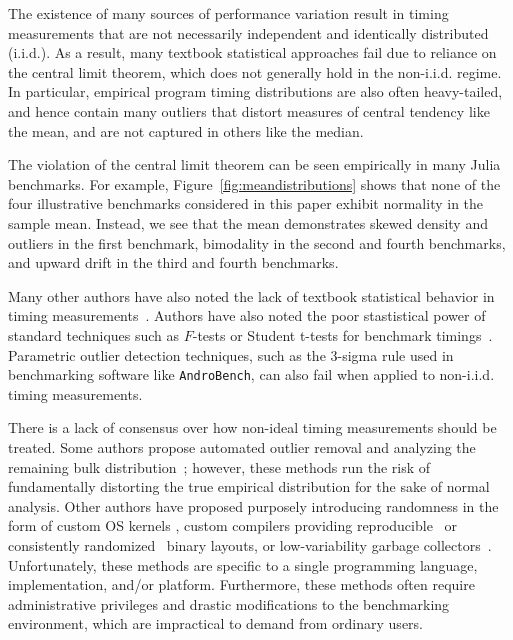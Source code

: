 \documentclass[conference]{IEEEtran}
\begin{document}
The existence of many sources of performance variation result in timing
measurements that are not necessarily independent and identically distributed
(i.i.d.). As a result, many textbook statistical approaches fail due to
reliance on the central limit theorem, which does not generally hold in the
non-i.i.d. regime. In particular, empirical program timing distributions are
also often heavy-tailed, and hence contain many outliers that distort measures
of central tendency like the mean, and are not captured in others like the
median.

The violation of the central limit theorem can be seen empirically in many Julia benchmarks.
For example, Figure~\ref{fig:meandistributions} shows that none of the four illustrative
benchmarks considered in this paper exhibit normality in the sample mean. Instead, we see
that the mean demonstrates skewed density and outliers in the first benchmark, bimodality in
the second and fourth benchmarks, and upward drift in the third and fourth benchmarks.

Many other authors have also noted the lack of textbook statistical behavior in timing
measurements~\cite{Gil2011,Chen2015,Rehn2015,Barrett2016}. Authors have also noted the poor
stastistical power of standard techniques such as $F$-tests or Student t-tests for benchmark
timings~\cite{Lilja2000,Mytkowicz2009,Kalibera2013,Chen2015,Barrett2016}. Parametric outlier
detection techniques, such as the 3-sigma rule used in benchmarking software like
\lstinline|AndroBench|\cite{Kim2012}, can also fail when applied to non-i.i.d. timing measurements.

There is a lack of consensus over how non-ideal timing measurements should be treated. Some
authors propose automated outlier removal and analyzing the remaining bulk
distribution~\cite{Kim2012}; however, these methods run the risk of fundamentally distorting
the true empirical distribution for the sake of normal analysis. Other authors have proposed
purposely introducing randomness in the form of custom OS kernels
\cite{Tessellation,Akkan2012}, custom compilers providing reproducible~\cite{Georges2008} or
consistently randomized~\cite{Curtsinger2013} binary layouts, or low-variability garbage
collectors~\cite{Huang2004}. Unfortunately, these methods are specific to a single
programming language, implementation, and/or platform. Furthermore, these methods often
require administrative privileges and drastic modifications to the benchmarking environment,
which are impractical to demand from ordinary users.
\end{document}
